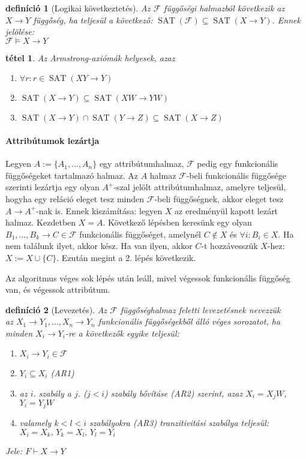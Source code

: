 \documentclass[fleqn,10pt,a4paper]{article}
\newcommand{\F}{\mathcal{F}}
\newcommand{\listazjromai}{
  \renewcommand{\theenumi}{\roman{enumi}}
  \renewcommand{\labelenumi}{(\theenumi)}
}
\newenvironment{enumzjromai}{\listazjromai\begin{enumerate}}{\end{enumerate}}
\newenvironment{enumzjr}{\begin{enumzjromai}}{\end{enumzjromai}}
\theoremstyle{magyar}
\newtheorem{de}{definíció}[section]
\newtheorem{te}{tétel}[section]
\DeclareMathOperator{\sat}{SAT}
\begin{document}
  
  \begin{de}[Logikai következtetés] Az $\mathcal F$ függőségi halmazból \emph{következik} az $X\to Y$ függőség, ha
    teljesül a következő: $\sat(\F) \subseteq \sat(X\to Y)$. Ennek jelölése: \\
    $\mathcal F \models X\to Y$
  \end{de}
  
  \begin{te}Az Armstrong-axiómák helyesek, azaz
    \begin{enumerate}
    \item $\forall r\colon r\in \sat(XY\to Y)$ 
    \item $\sat(X\to Y)\subseteq\sat(XW\to YW)$
    \item $\sat(X\to Y)\cap\sat(Y\to Z) \subseteq \sat(X\to Z)$
    \end{enumerate}
  \end{te}

  \paragraph{Attribútumok lezártja} Legyen $A:=\{A_1,\ldots,A_n\}$ egy attribútumhalmaz, $\F$ pedig egy funkcionális
  függőségeket tartalmazó halmaz. Az $A$ halmaz $\F$-beli funkcionális függősége szerinti lezártja egy olyan $A^+$-szal
  jelölt attribútumhalmaz, amelyre teljesül, hogyha egy reláció eleget tesz minden $\F$-beli függőségnek, akkor eleget
  tesz $A\to A^+$-nak is.
  Ennek kiszámítása: legyen $X$ az eredményül kapott lezárt halmaz. Kezdetben $X=A$. Következő lépésben keresünk egy
  olyan $B_1,\ldots,B_k\to C\in \F$ funkcionális függőséget, amelynél $C\not\in X$ és $\forall i: B_i\in X$. Ha nem
  találunk ilyet, akkor kész. Ha van ilyen, akkor $C$-t hozzávesszük $X$-hez: $X := X \cup \{C\}$. Ezután megint a
  2. lépés következik.

  Az algoritmus véges sok lépés után leáll, mivel végessok funkcionális függőség van, és végessok attribútum.

  \begin{de}[Levezetés] Az $\F$ függőséghalmaz feletti levezetésnek nevezzük\\ az $X_1\to Y_1,\ldots,X_n\to Y_n$
    funkcionális függőségekből álló véges sorozatot, ha\\ minden $X_i\to Y_i$-re a következők egyike teljesül:
    \begin{enumzjr}
    \item $X_i\to Y_i \in \F$
    \item $Y_i\subseteq X_i$ \emph{\small{(AR1)}}
    \item az $i$. szabály a $j$. ($j<i$) szabály bővításe \emph{\small{(AR2)}} szerint, azaz $X_i=X_jW$, $Y_i=Y_jW$
    \item valamely $k<l <i$ szabályokra \emph{\small{(AR3)}} tranzitivitási szabálya teljesül:
      $X_i=X_k,\,Y_k=X_l,\,Y_l=Y_i$

    \end{enumzjr}
    Jele: $F\vdash X\to Y$
  \end{de}
\end{document}
